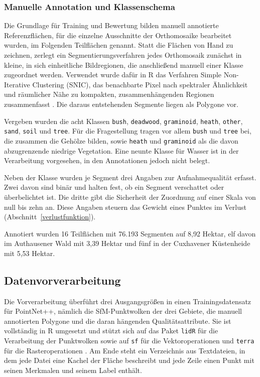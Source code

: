 \subsubsection{Manuelle Annotation und Klassenschema}\label{annotation}

Die Grundlage für Training und Bewertung bilden manuell annotierte Referenzflächen, für die einzelne Ausschnitte der Orthomosaike bearbeitet wurden, im Folgenden Teilflächen genannt. Statt die Flächen von Hand zu zeichnen, zerlegt ein Segmentierungsverfahren jedes Orthomosaik zunächst in kleine, in sich einheitliche Bildregionen, die anschließend manuell einer Klasse zugeordnet werden. Verwendet wurde dafür in R das Verfahren Simple Non-Iterative Clustering (SNIC), das benachbarte Pixel nach spektraler Ähnlichkeit und räumlicher Nähe zu kompakten, zusammenhängenden Regionen zusammenfasst \cite{Achanta.2017}. Die daraus entstehenden Segmente liegen als Polygone vor.

Vergeben wurden die acht Klassen \texttt{bush}, \texttt{deadwood},
\texttt{graminoid}, \texttt{heath}, \texttt{other}, \texttt{sand},
\texttt{soil} und \texttt{tree}. Für die Fragestellung tragen vor allem \texttt{bush} und \texttt{tree} bei, die zusammen die Gehölze bilden, sowie \texttt{heath} und \texttt{graminoid} als die davon abzugrenzende niedrige Vegetation. Eine neunte Klasse für Wasser ist in der Verarbeitung vorgesehen, in den Annotationen jedoch nicht belegt.

Neben der Klasse wurden je Segment drei Angaben zur Aufnahmequalität erfasst. Zwei davon sind binär und halten fest, ob ein Segment verschattet oder überbelichtet ist. Die dritte gibt die Sicherheit der Zuordnung auf einer Skala von null bis zehn an. Diese Angaben steuern das Gewicht eines Punktes im Verlust (Abschnitt~\ref{verlustfunktion}).

Annotiert wurden 16 Teilflächen mit 76.193 Segmenten auf 8,92 Hektar, elf davon im Authausener Wald mit 3,39 Hektar und fünf in der Cuxhavener Küstenheide mit 5,53 Hektar.

\subsection{Datenvorverarbeitung}\label{datenvorverarbeitung}

Die Vorverarbeitung überführt drei Ausgangsgrößen in einen Trainingsdatensatz für PointNet++, nämlich die SfM-Punktwolken der drei Gebiete, die manuell annotierten Polygone und die daran hängenden Qualitätsattribute. Sie ist vollständig in R umgesetzt und stützt sich auf das Paket \texttt{lidR} für die Verarbeitung der Punktwolken \cite{Roussel.2020} sowie auf \texttt{sf} für die Vektoroperationen \cite{Pebesma.2018} und \texttt{terra} für die Rasteroperationen \cite{Hijmans.2025}. Am Ende steht ein Verzeichnis aus Textdateien, in dem jede Datei eine Kachel der Fläche beschreibt und jede Zeile einen Punkt mit seinen Merkmalen und seinem Label enthält.

